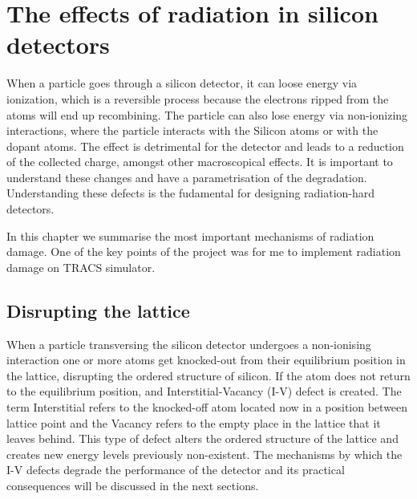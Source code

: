 \chapter{The effects of radiation in silicon detectors}%
\label{sec:rad}

When a particle goes through a silicon detector, it can loose energy via ionization, which is a reversible process because the electrons ripped from the atoms will end up recombining. The particle can also lose energy via non-ionizing interactions, where the particle interacts with the Silicon atoms or with the dopant atoms. The effect is detrimental for the detector and leads to a reduction of the collected charge, amongst other macroscopical effects. It is important to understand these changes and have a parametrisation of the degradation. Understanding these defects is the fudamental for designing radiation-hard detectors.

In this chapter we summarise the most important mechanisms of radiation damage. One of the key points of the project was for me to implement radiation damage on TRACS simulator.


\section{Disrupting the lattice}%

When a particle transversing the silicon detector undergoes a non-ionising interaction one or more atoms get knocked-out from their equilibrium position in the lattice, disrupting the ordered structure of silicon. If the atom does not return to the equilibrium position, and Interstitial-Vacancy (I-V) defect is created. The term Interstitial refers to the knocked-off atom located now in a position between lattice point and the Vacancy refers to the empty place in the lattice that it leaves behind. This type of defect alters the ordered structure of the lattice and creates new energy levels previously non-existent. The mechanisms by which the I-V defects degrade the performance of the detector and its practical consequences will be discussed in the next sections.


